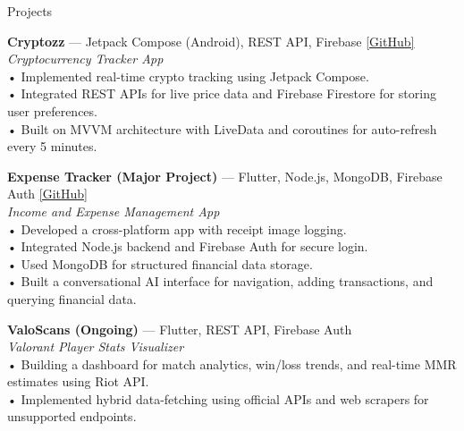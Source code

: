 \documentclass[10pt]{resume}
\begin{document}
\begin{rSection}{Projects}

\textbf{Cryptozz} — Jetpack Compose (Android), REST API, Firebase 
\href{https://github.com/Harshit332004/CryptocurrencyApp-Retrofit}{\underline{[GitHub]}} \\
\textit{Cryptocurrency Tracker App} \\
• Implemented real-time crypto tracking using Jetpack Compose. \\
• Integrated REST APIs for live price data and Firebase Firestore for storing user preferences. \\
• Built on MVVM architecture with LiveData and coroutines for auto-refresh every 5 minutes. 

\textbf{Expense Tracker (Major Project)} — Flutter, Node.js, MongoDB, Firebase Auth 
\href{https://github.com/Harshit332004/Expense_Tracker}{\underline{[GitHub]}} \\
\textit{Income and Expense Management App} \\
• Developed a cross-platform app with receipt image logging. \\
• Integrated Node.js backend and Firebase Auth for secure login. \\
• Used MongoDB for structured financial data storage. \\
• Built a conversational AI interface for navigation, adding transactions, and querying financial data. 

\textbf{ValoScans (Ongoing)} — Flutter, REST API, Firebase Auth \\
\textit{Valorant Player Stats Visualizer} \\
• Building a dashboard for match analytics, win/loss trends, and real-time MMR estimates using Riot API. \\
• Implemented hybrid data-fetching using official APIs and web scrapers for unsupported endpoints. 

\end{rSection}


\end{document}
